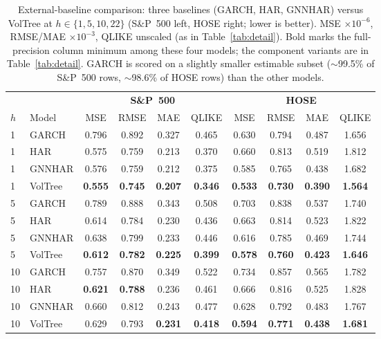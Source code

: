\documentclass[runningheads,a4paper]{llncs}
\begin{document}
\FloatBarrier
\begin{table}[t]
\centering
\caption{External-baseline comparison: three baselines (GARCH, HAR, GNNHAR) versus VolTree at
$h\in\{1,5,10,22\}$ (S\&P~500 left, HOSE right; lower is better). MSE $\times10^{-6}$, RMSE/MAE
$\times10^{-3}$, QLIKE unscaled (as in Table~\ref{tab:detail}). Bold marks the full-precision column
minimum among these four models; the component variants are in Table~\ref{tab:detail}. GARCH is scored on a
slightly smaller estimable subset ($\sim$99.5\% of S\&P~500 rows, $\sim$98.6\% of HOSE rows) than the other
models.}
\label{tab:summary}
\scriptsize
\setlength{\tabcolsep}{3pt}
\begin{tabular}{ll cccc cccc}
\toprule
& & \multicolumn{4}{c}{\textbf{S\&P~500}} & \multicolumn{4}{c}{\textbf{HOSE}} \\
\cmidrule(lr){3-6}\cmidrule(lr){7-10}
$h$ & Model & MSE & RMSE & MAE & QLIKE & MSE & RMSE & MAE & QLIKE \\
\midrule
1 & GARCH    & 0.796 & 0.892 & 0.327 & 0.465 & 0.630 & 0.794 & 0.487 & 1.656 \\
1 & HAR      & 0.575 & 0.759 & 0.213 & 0.370 & 0.660 & 0.813 & 0.519 & 1.812 \\
1 & GNNHAR   & 0.576 & 0.759 & 0.212 & 0.375 & 0.585 & 0.765 & 0.438 & 1.682 \\
1 & VolTree & \textbf{0.555} & \textbf{0.745} & \textbf{0.207} & \textbf{0.346} & \textbf{0.533} & \textbf{0.730} & \textbf{0.390} & \textbf{1.564} \\
\midrule
5 & GARCH    & 0.789 & 0.888 & 0.343 & 0.508 & 0.703 & 0.838 & 0.537 & 1.740 \\
5 & HAR      & 0.614 & 0.784 & 0.230 & 0.436 & 0.663 & 0.814 & 0.523 & 1.822 \\
5 & GNNHAR   & 0.638 & 0.799 & 0.233 & 0.446 & 0.616 & 0.785 & 0.469 & 1.744 \\
5 & VolTree & \textbf{0.612} & \textbf{0.782} & \textbf{0.225} & \textbf{0.399} & \textbf{0.578} & \textbf{0.760} & \textbf{0.423} & \textbf{1.646} \\
\midrule
10 & GARCH    & 0.757 & 0.870 & 0.349 & 0.522 & 0.734 & 0.857 & 0.565 & 1.782 \\
10 & HAR      & \textbf{0.621} & \textbf{0.788} & 0.236 & 0.461 & 0.666 & 0.816 & 0.525 & 1.828 \\
10 & GNNHAR   & 0.660 & 0.812 & 0.243 & 0.477 & 0.628 & 0.792 & 0.483 & 1.767 \\
10 & VolTree & 0.629 & 0.793 & \textbf{0.231} & \textbf{0.418} & \textbf{0.594} & \textbf{0.771} & \textbf{0.438} & \textbf{1.681} \\

\end{tabular}
\end{table}
\end{document}
